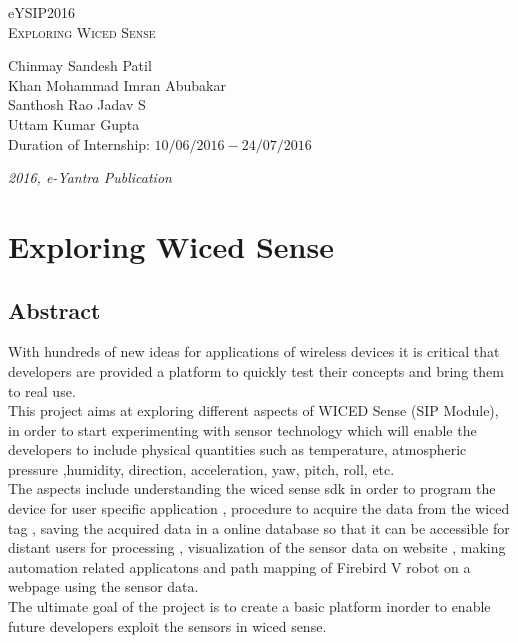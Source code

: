 \documentclass[a4paper,12pt,oneside]{book}
\begin{document}
\begin{titlepage}
\raggedright
{\Large eYSIP2016\\[1cm]}
{\Huge\scshape Exploring Wiced Sense \\[.1in]}
\vfill
\begin{flushright}
{\large Chinmay Sandesh Patil \\}
{\large Khan Mohammad Imran Abubakar \\}
{\large Santhosh Rao Jadav S\\}
{\large Uttam Kumar Gupta \\}
{\large Duration of Internship: $ 10/06/2016-24/07/2016 $ \\}
\end{flushright}

{\itshape 2016, e-Yantra Publication}
\end{titlepage}

\chapter[Exploring Wiced Sense]{Exploring Wiced Sense}

\section{Abstract}

\hspace{5mm} With hundreds of new ideas for applications of wireless devices it is critical that developers are provided a platform to quickly test their
concepts and bring them to real use. 
\\ \hspace{5mm} This project aims at exploring different aspects of WICED Sense (SIP Module), in order to start
experimenting with sensor technology which will enable the developers to include physical quantities such as temperature, atmospheric pressure ,humidity, direction, acceleration, yaw, pitch, roll, etc.
\\ \hspace{5mm}
The aspects include understanding the wiced sense sdk in order to program the device for user specific application , procedure to acquire the data from the wiced tag , saving the acquired data in a online database so that it can be accessible for distant users for processing , visualization of the sensor data on website , making automation related applicatons and path mapping of Firebird V robot on a webpage using the sensor data.
\\ \hspace{5mm}
The ultimate goal of the project is to create a basic platform inorder to enable future developers exploit the sensors in wiced sense.
\end{document}
